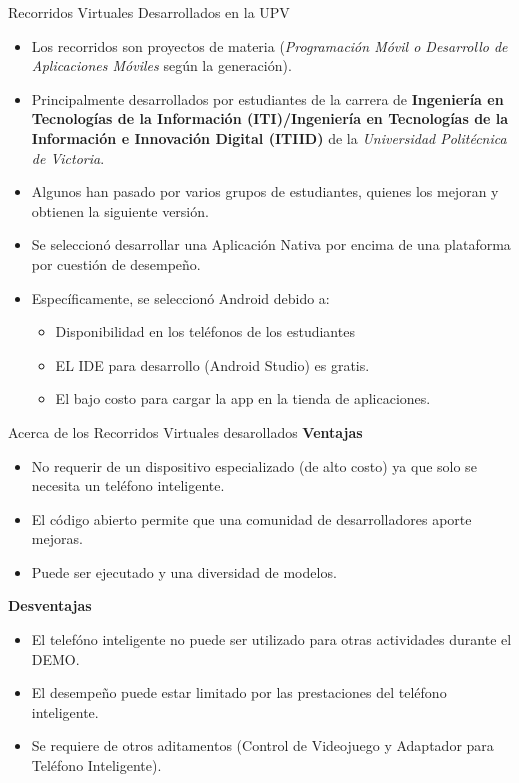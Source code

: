 \documentclass[aspectratio=169,compress]{beamer}
\begin{document}
\begin{frame}{Recorridos Virtuales Desarrollados en la UPV}
\textbf{}
\begin{itemize}
\item Los recorridos son proyectos de materia (\textit{Programación Móvil o Desarrollo de Aplicaciones Móviles} según la generación). 
\item Principalmente desarrollados por estudiantes de la carrera de \textbf{Ingeniería en Tecnologías de la Información (ITI)/Ingeniería en Tecnologías de la Información e Innovación Digital (ITIID)} de la \textit{Universidad Politécnica de Victoria}.
\item Algunos han pasado por varios grupos de estudiantes, quienes los mejoran y obtienen la siguiente versión.  
\item Se seleccionó desarrollar una Aplicación Nativa por encima de una plataforma por cuestión de desempeño. 
\item Específicamente, se seleccionó Android debido a:
\begin{itemize}
\item Disponibilidad en los teléfonos de los estudiantes 
\item EL IDE para desarrollo (Android Studio) es gratis.  
\item El bajo costo para cargar la app en la tienda de aplicaciones.  
\end{itemize}

\end{itemize}
\end{frame}

 
\begin{frame}{Acerca de los Recorridos Virtuales desarollados}
\textbf{Ventajas}
\begin{itemize}
    \item No requerir de un dispositivo especializado (de alto costo) ya que solo se necesita un teléfono inteligente.
    \item El código abierto permite que una comunidad de desarrolladores aporte mejoras.
	\item Puede ser ejecutado y una diversidad de modelos. 
\end{itemize}

\textbf{Desventajas}
\begin{itemize}
    \item El telefóno inteligente no puede ser utilizado para otras actividades durante el DEMO. 
    \item El desempeño puede estar limitado por las prestaciones del teléfono inteligente.
    \item Se requiere de otros aditamentos (Control de Videojuego y Adaptador para Teléfono Inteligente).
\end{itemize}

\end{frame}
\end{document}
